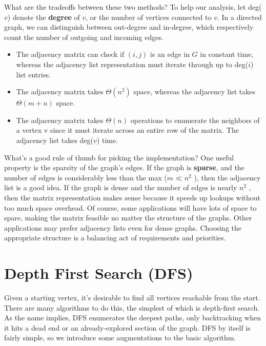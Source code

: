 \documentclass [12pt]{article}
\begin{document}
What are the tradeoffs between these two methods? To help our analysis, let deg($v$) denote the \textbf{degree} of $v$, or the number of vertices connected to $v$. In a directed graph, we can distinguish between out-degree and in-degree, which respectively count the number of outgoing and incoming edges.

\begin{itemize}
  \item The adjacency matrix can check if $(i, j)$ is an edge in $G$ in constant time, whereas the adjacency list representation must iterate through up to deg($i$) list entries.
  \item The adjacency matrix takes $\Theta(n^2)$ space, whereas the adjacency list takes $\Theta(m + n)$ space.
  \item The adjacency matrix takes $\Theta(n)$ operations to enumerate the neighbors of a vertex v since it must iterate across an entire row of the matrix. The adjacency list takes deg($v $) time.
\end{itemize}
 
What's a good rule of thumb for picking the implementation? One useful property is the sparsity of the graph's edges. If the graph is \textbf{sparse}, and the number of edges is considerably less than the max ($m \ll n^2$ ), then the adjacency list is a good idea. If the graph is dense and the number of edges is nearly $n^2$ , then the matrix representation makes sense because it speeds up lookups without too much space overhead. Of course, some applications will have lots of space to spare, making the matrix feasible no matter the structure of the graphs. Other applications may prefer adjacency lists even for dense graphs. Choosing the appropriate structure is a balancing act of requirements and priorities.

\section{Depth First Search (DFS)} 

Given a starting vertex, it's desirable to find all vertices reachable from the start. There are many algorithms to do this, the simplest of which is depth-first search. As the name implies, DFS enumerates the deepest paths, only backtracking when it hits a dead end or an already-explored section of the graph. DFS by itself is fairly simple, so we introduce some augmentations to the basic algorithm. 
\end{document}
